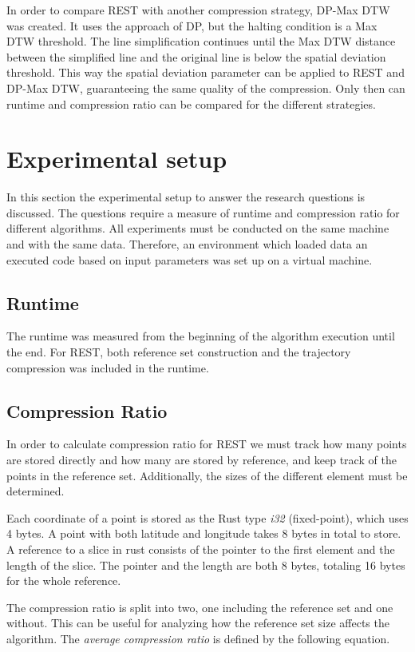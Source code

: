 In order to compare REST with another compression strategy, DP-Max DTW was created. It uses the approach of DP, but the halting condition is a Max DTW threshold. The line simplification continues until the Max DTW distance between the simplified line and the original line is below the spatial deviation threshold. This way the spatial deviation parameter can be applied to REST and DP-Max DTW, guaranteeing the same quality of the compression. Only then can runtime and compression ratio can be compared for the different strategies.

\section{Experimental setup}
In this section the experimental setup to answer the research questions is discussed. The questions require a measure of runtime and compression ratio for different algorithms. All experiments must be conducted on the same machine and with the same data. Therefore, an environment which loaded data an executed code based on input parameters was set up on a virtual machine.

\subsection{Runtime}
The runtime was measured from the beginning of the algorithm execution until the end. For REST, both reference set construction and the trajectory compression was included in the runtime.
\subsection{Compression Ratio}
In order to calculate compression ratio for REST we must track how many points are stored directly and how many are stored by reference, and keep track of the points in the reference set. Additionally, the sizes of the different element must be determined.

Each coordinate of a point is stored as the Rust type \textit{i32} (fixed-point), which uses 4 bytes. A point with both latitude and longitude takes 8 bytes in total to store. A reference to a slice in rust consists of the pointer to the first element and the length of the slice. The pointer and the length are both 8 bytes, totaling 16 bytes for the whole reference.

The compression ratio is split into two, one including the reference set and one without. This can be useful for analyzing how the reference set size affects the algorithm. The \textit{average compression ratio} is defined by the following equation.

